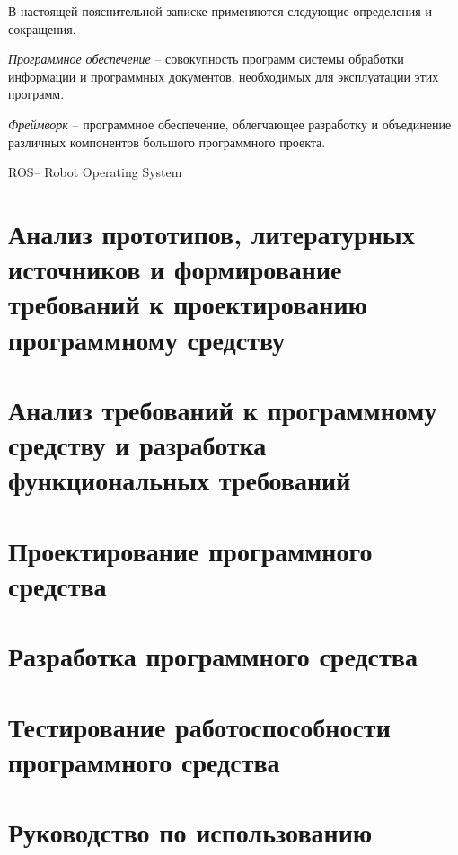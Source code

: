



\newcommand{\appname}{ПО} 
\newcommand{\ros}{ROS}


В настоящей пояснительной записке применяются следующие определения и
сокращения.

\textit{Программное обеспечение} -- совокупность программ системы обработки
информации и программных документов, необходимых для эксплуатации этих
программ.


\textit{Фреймворк} -- программное обеспечение, облегчающее разработку и
объединение различных компонентов большого программного проекта.

\ros -- Robot Operating System


\section{Анализ прототипов, литературных источников и формирование требований
к проектированию программному средству}
\cite{thrun2006probalistic}


\section{Анализ требований к программному средству и разработка функциональных
требований}

\section{Проектирование программного средства}

\section{Разработка программного средства}

\section{Тестирование работоспособности программного средства}

\section{Руководство по использованию}

